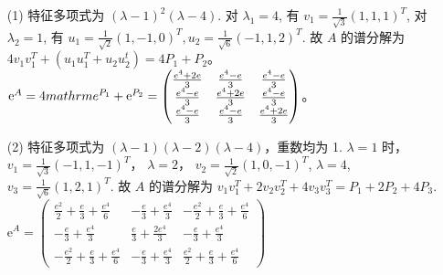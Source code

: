 \documentclass{article}
\begin{document}
\begin{itemize}
    \item [(1)] 特征多项式为 $(\lambda - 1)^2(\lambda - 4)$. 对 $\lambda_1 = 4$, 有 $v_1 = \frac{1}{\sqrt{3}}(1, 1, 1)^T$, 对 $\lambda_2 = 1$, 有 $u_1 = \frac{1}{\sqrt{2}}(1, -1, 0)^T, u_2 = \frac{1}{\sqrt{6}}(-1, 1, 2)^T$. 故 $A$ 的谱分解为 $4v_1v_1^T + (u_1u_1^T + u_2u_2^t) = 4P_1 + P_2$。 $\mathrm{e}^A = 4\\mathrm{e}^{P_1} + \mathrm{e}^{P_2} = \begin{pmatrix}
        \frac{e^4 + 2e}{3} & \frac{e^4 - e}{3} & \frac{e^4 - e}{3} \\
        \frac{e^4 - e}{3} & \frac{e^4 + 2e}{3} & \frac{e^4 - e}{3} \\
        \frac{e^4 - e}{3} & \frac{e^4 - e}{3} & \frac{e^4 + 2e}{3}
    \end{pmatrix}$。
    \item [(2)] 特征多项式为 $(\lambda - 1)(\lambda - 2)(\lambda - 4)$，重数均为 1. $\lambda = 1$ 时， $v_1 = \frac{1}{\sqrt{3}}(-1, 1, -1)^T$， $\lambda = 2$， $v_2 = \frac{1}{\sqrt{2}}(1, 0, -1)^T$,  $\lambda = 4$, $v_3 = \frac{1}{\sqrt{6}}(1, 2, 1)^T$. 故 $A$ 的谱分解为 $v_1v_1^T + 2v_2v_2^T + 4v_3v_3^T = P_1 + 2P_2 + 4P_3$. $\mathrm{e}^A = \begin{pmatrix}
        \frac{e^2}{2} + \frac{e}{3} + \frac{e^4}{6} & -\frac{e}{3} + \frac{e^4}{3} & -\frac{e^2}{2} + \frac{e}{3} + \frac{e^4}{6} \\
        -\frac{e}{3} + \frac{e^4}{3} & \frac{e}{3} + \frac{2e^4}{3} & -\frac{e}{3} + \frac{e^4}{3} \\
        -\frac{e^2}{2} + \frac{e}{3} + \frac{e^4}{6} & -\frac{e}{3} + \frac{e^4}{3} & \frac{e^2}{2} + \frac{e}{3} + \frac{e^4}{6}
    \end{pmatrix}$
\end{itemize}

\section{}
\end{document}
